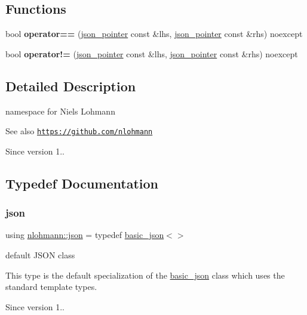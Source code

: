 \subsection*{Functions}
\begin{DoxyCompactItemize}
\item 
\mbox{\label{namespacenlohmann_ab6e16643bf41fc07de3aaa349967d5ef}} 
bool {\bfseries operator==} (\hyperlink{classnlohmann_1_1json__pointer}{json\+\_\+pointer} const \&lhs, \hyperlink{classnlohmann_1_1json__pointer}{json\+\_\+pointer} const \&rhs) noexcept
\item 
\mbox{\label{namespacenlohmann_a455cdb20f9efd12811ec2f6d367e28a5}} 
bool {\bfseries operator!=} (\hyperlink{classnlohmann_1_1json__pointer}{json\+\_\+pointer} const \&lhs, \hyperlink{classnlohmann_1_1json__pointer}{json\+\_\+pointer} const \&rhs) noexcept
\end{DoxyCompactItemize}


\subsection{Detailed Description}
namespace for Niels Lohmann 

\begin{DoxySeeAlso}{See also}
\href{https://github.com/nlohmann}{\tt https\+://github.\+com/nlohmann} 
\end{DoxySeeAlso}
\begin{DoxySince}{Since}
version 1.. 
\end{DoxySince}


\subsection{Typedef Documentation}
\mbox{\label{namespacenlohmann_a2bfd99e845a2e5cd90aeaf1b1431f474}} 
\subsubsection{\texorpdfstring{json}{json}}
{\footnotesize\ttfamily using \hyperlink{namespacenlohmann_a2bfd99e845a2e5cd90aeaf1b1431f474}{nlohmann\+::json} = typedef \hyperlink{classnlohmann_1_1basic__json}{basic\+\_\+json}$<$$>$}



default J\+S\+ON class 

This type is the default specialization of the \hyperlink{classnlohmann_1_1basic__json}{basic\+\_\+json} class which uses the standard template types.

\begin{DoxySince}{Since}
version 1.. 
\end{DoxySince}
